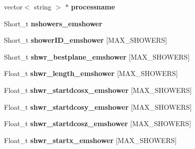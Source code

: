\begin{DoxyCompactItemize}
\item 
\hypertarget{classanatree_a5f73011fc98884bb1cfe96f9dcc863e7}{vector$<$ string $>$ $\ast$ {\bfseries processname}}\label{classanatree_a5f73011fc98884bb1cfe96f9dcc863e7}

\item 
\hypertarget{classanatree_a80eafdfb7712108c482a65427d4dab62}{Short\-\_\-t {\bfseries nshowers\-\_\-emshower}}\label{classanatree_a80eafdfb7712108c482a65427d4dab62}

\item 
\hypertarget{classanatree_a35b20eca4b3c6b9309254a99199aa916}{Short\-\_\-t {\bfseries shower\-I\-D\-\_\-emshower} \mbox{[}M\-A\-X\-\_\-\-S\-H\-O\-W\-E\-R\-S\mbox{]}}\label{classanatree_a35b20eca4b3c6b9309254a99199aa916}

\item 
\hypertarget{classanatree_a3ba83de19a2215bceb3527513df9e878}{Short\-\_\-t {\bfseries shwr\-\_\-bestplane\-\_\-emshower} \mbox{[}M\-A\-X\-\_\-\-S\-H\-O\-W\-E\-R\-S\mbox{]}}\label{classanatree_a3ba83de19a2215bceb3527513df9e878}

\item 
\hypertarget{classanatree_a6cb463353d2afb0949886483b33f8549}{Float\-\_\-t {\bfseries shwr\-\_\-length\-\_\-emshower} \mbox{[}M\-A\-X\-\_\-\-S\-H\-O\-W\-E\-R\-S\mbox{]}}\label{classanatree_a6cb463353d2afb0949886483b33f8549}

\item 
\hypertarget{classanatree_a5df50459b3dc4260963b5231427968c4}{Float\-\_\-t {\bfseries shwr\-\_\-startdcosx\-\_\-emshower} \mbox{[}M\-A\-X\-\_\-\-S\-H\-O\-W\-E\-R\-S\mbox{]}}\label{classanatree_a5df50459b3dc4260963b5231427968c4}

\item 
\hypertarget{classanatree_a5ecdd272fc336ed529dcc53acc471f49}{Float\-\_\-t {\bfseries shwr\-\_\-startdcosy\-\_\-emshower} \mbox{[}M\-A\-X\-\_\-\-S\-H\-O\-W\-E\-R\-S\mbox{]}}\label{classanatree_a5ecdd272fc336ed529dcc53acc471f49}

\item 
\hypertarget{classanatree_a700d6e7e8277518dcb7d497574c308ab}{Float\-\_\-t {\bfseries shwr\-\_\-startdcosz\-\_\-emshower} \mbox{[}M\-A\-X\-\_\-\-S\-H\-O\-W\-E\-R\-S\mbox{]}}\label{classanatree_a700d6e7e8277518dcb7d497574c308ab}

\item 
\hypertarget{classanatree_a4cc58d005e47a1ca0abd2ef9fd226462}{Float\-\_\-t {\bfseries shwr\-\_\-startx\-\_\-emshower} \mbox{[}M\-A\-X\-\_\-\-S\-H\-O\-W\-E\-R\-S\mbox{]}}\label{classanatree_a4cc58d005e47a1ca0abd2ef9fd226462}


\end{DoxyCompactItemize}
